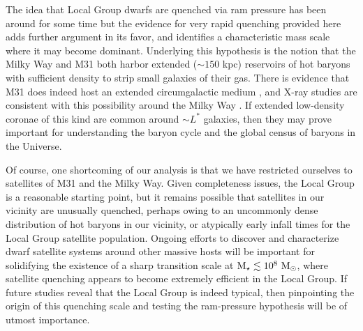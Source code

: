 The idea that Local Group dwarfs are quenched via ram pressure has
been around for some time \citep[e.g.][]{einasto74, lin83, blitz00}
but the evidence for very rapid quenching provided here adds further
argument in its favor, and identifies a characteristic mass scale
where it may become dominant. Underlying this hypothesis is the notion
that the Milky Way and M31 both harbor extended ($\sim 150$ kpc)
reservoirs of hot baryons with sufficient density to strip small
galaxies of their gas. There is evidence that M31 does indeed host an
extended circumgalactic medium \citep{lehner15}, and X-ray studies are
consistent with this possibility around the Milky Way
\citep{fang13,miller15,fang15}. If extended low-density coronae of
this kind are common around $\sim L^{*}$ galaxies, then they may prove
important for understanding the baryon cycle and the global census of
baryons in the Universe.


Of course, one shortcoming of our analysis is that we have restricted
ourselves to satellites of M31 and the Milky Way. Given completeness
issues, the Local Group is a reasonable starting point, but it remains
possible that satellites in our vicinity are unusually quenched,
perhaps owing to an uncommonly dense distribution of hot baryons in
our vicinity, or atypically early infall times for the Local Group
satellite population. Ongoing efforts to discover and characterize
dwarf satellite systems around other massive hosts will be important
for solidifying the existence of a sharp transition scale at ${\rm M}_{\star}
\lesssim 10^{8}~{\rm M}_{\odot}$, where satellite quenching appears to become
extremely efficient in the Local Group. If future studies reveal that
the Local Group is indeed typical, then pinpointing the origin of this
quenching scale and testing the ram-pressure hypothesis will be of
utmost importance.
